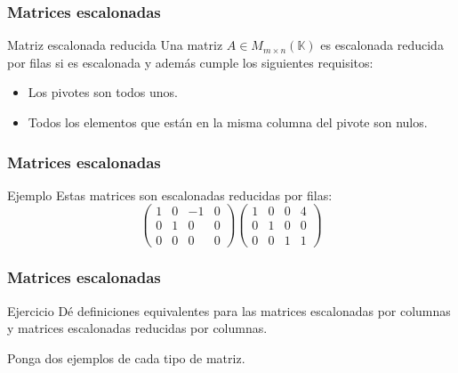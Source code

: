 \documentclass[12pt]{article}
\begin{document}
 \begin{frame}
  \frametitle{Matrices escalonadas}

 \begin{block}{Matriz escalonada reducida}
Una matriz $A\in M_{m\times n}(\mathbb{K})$ es escalonada  reducida por filas si es escalonada y adem\'as cumple los siguientes requisitos:
\begin{itemize}
\item Los pivotes son todos unos.
\item Todos los elementos que est\'an en la misma columna del pivote son nulos.
\end{itemize}
\end{block}
\end{frame} 



 \begin{frame}
  \frametitle{Matrices escalonadas}

 \begin{block}{Ejemplo}
Estas matrices son escalonadas reducidas por filas:
\[
\left(\begin{array}{cccc}1 & 0 & -1 & 0 \\0 & 1 & 0 & 0 \\0 & 0 & 0 & 0\end{array}\right)
\left(\begin{array}{cccc}1 & 0 & 0 & 4 \\0 & 1 & 0 & 0 \\0 & 0 & 1 & 1\end{array}\right)
\]
\end{block}
\end{frame} 



 \begin{frame}
  \frametitle{Matrices escalonadas}

 \begin{block}{Ejercicio}
 D\'e definiciones equivalentes para las matrices escalonadas por columnas y matrices escalonadas reducidas por columnas.

Ponga dos ejemplos de cada tipo de matriz.
 

\end{block}
\end{frame} 
\end{document}
